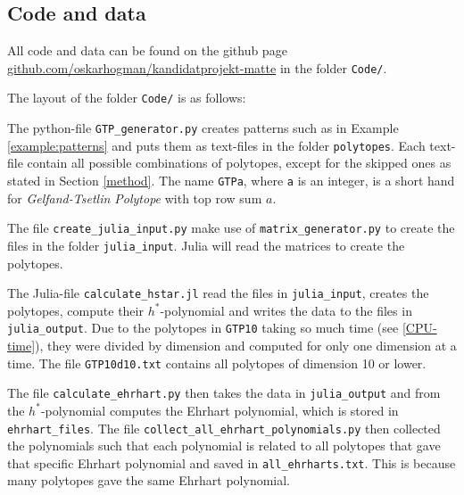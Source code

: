 \subsection{Code and data}
All code and data can be found on the github page \href{https://github.com/oskarhogman/kandidatprojekt-matte/tree/main}{github.com/oskarhogman/kandidatprojekt-matte} in the folder \verb+Code/+. 

The layout of the folder \verb+Code/+ is as follows:



\bigskip

The python-file \verb+GTP_generator.py+ creates patterns such as in Example \ref{example:patterns} and puts them as text-files in the folder \verb+polytopes+. Each text-file contain all possible combinations of polytopes, except for the skipped ones as stated in Section \ref{method}. The name \verb+GTPa+, where \verb+a+ is an integer, is a short hand for \emph{Gelfand-Tsetlin Polytope} with top row sum $a$. 

The file \verb+create_julia_input.py+ make use of \verb+matrix_generator.py+ to create the files in the folder \verb+julia_input+. Julia will read the matrices to create the polytopes. 

The Julia-file \verb+calculate_hstar.jl+ read the files in \verb+julia_input+, creates the polytopes, compute their $h^*$-polynomial and writes the data to the files in \verb+julia_output+. 
Due to the polytopes in \verb+GTP10+ taking so much time (see \ref{CPU-time}), they were divided by dimension and computed for only one dimension at a time. The file \verb+GTP10d10.txt+ contains all polytopes of dimension 10 or lower.

The file \verb+calculate_ehrhart.py+ then takes the data in \verb+julia_output+ and from the $h^*$-polynomial computes the Ehrhart polynomial, which is stored in \verb+ehrhart_files+. 
The file \verb+collect_all_ehrhart_polynomials.py+ then collected the polynomials such that each polynomial is related to all polytopes that gave that specific Ehrhart polynomial and saved in \verb+all_ehrharts.txt+. This is because many polytopes gave the same Ehrhart polynomial. 

